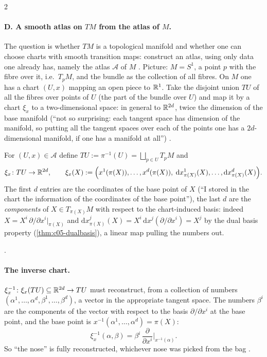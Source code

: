 \begin{paracol}{2}
\paragraph{D. A smooth atlas on $TM$ from the atlas of $M$.} The question is whether $TM$ is a topological manifold and whether one can choose charts with smooth transition maps: construct an atlas, using only data one already has, namely the atlas $\mathcal A$ of $M$ .
Picture: $M=S^1$, a point $p$ with the fibre over it, i.e.\ $T_pM$, and the bundle as the collection of all fibres. On $M$ one has a chart $(U,x)$ mapping an open piece to $\mathbb{R}^1$. Take the disjoint union $TU$ of all the fibres over points of $U$ (the part of the bundle over $U$) and map it by a chart $\xi_x$ to a two-dimensional space: in general to $\mathbb{R}^{2d}$, twice the dimension of the base manifold
(``not so surprising: each tangent space has dimension of the manifold, so putting all the tangent spaces over each of the points one has a $2d$-dimensional manifold, if one has a manifold at all'') .

\begin{definition}\label{def:c06-xi}
For $(U,x)\in\mathcal A$ define $TU:=\pi^{-1}(U)=\bigsqcup_{p\in U}T_pM$ and
\[
  \xi_x\colon TU\to\mathbb{R}^{2d},\qquad\xi_x(X):=\Bigl(x^1(\pi(X)),\dots,x^d(\pi(X)),\;\mathrm dx^1_{\pi(X)}(X),\dots,\mathrm dx^d_{\pi(X)}(X)\Bigr).
\]
The first $d$ entries are the coordinates of the base point of $X$ (``I stored in the chart the information of the coordinates of the base point''), the last $d$ are the \emph{components} of $X\in T_{\pi(X)}M$ with respect to the chart-induced basis: indeed $X=X^i\,\partial/\partial x^i|_{\pi(X)}$ and
$\mathrm dx^j_{\pi(X)}(X)=X^i\,\mathrm dx^j(\partial/\partial x^i)=X^j$ by the dual basis property (\cref{thm:c05-dualbasis}), a linear map pulling the numbers out.
\end{definition}
.

\paragraph{The inverse chart.} $\xi_x^{-1}\colon\xi_x(TU)\subseteq\mathbb{R}^{2d}\to TU$ must reconstruct, from a collection of numbers $(\alpha^1,\dots,\alpha^d,\beta^1,\dots,\beta^d)$, a vector in the appropriate tangent space. The numbers $\beta^i$ are the components of the vector with respect to the basis $\partial/\partial x^i$ at the base point, and the base point is $x^{-1}(\alpha^1,\dots,\alpha^d)=\pi(X)$:
\[
  \xi_x^{-1}(\alpha,\beta)=\beta^i\,\frac{\partial}{\partial x^i}\Big|_{x^{-1}(\alpha)}.
\]
So ``the nose'' is fully reconstructed, whichever nose was picked from the bag .


\end{paracol}
